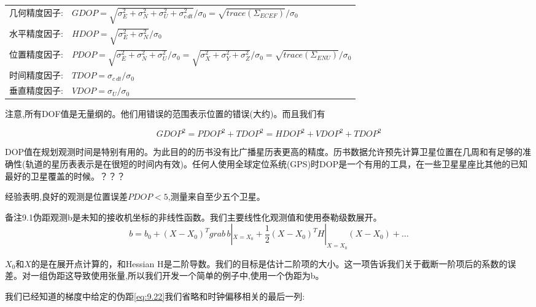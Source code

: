 		\begin{table}

			\begin{tabularx}{\textwidth}{lX}

				几何精度因子: & $GDOP=\sqrt{\sigma^2_E+\sigma^2_N+\sigma^2_U+\sigma^2_{c\,dt}}/\sigma_0=\sqrt{trace(\Sigma_{ECEF})}/\sigma_0$ \\

				水平精度因子:&$HDOP=\sqrt{\sigma^2_E+\sigma^2_N}/\sigma_0$ \\

				位置精度因子:  & $PDOP=\sqrt{\sigma^2_E+\sigma^2_N+\sigma^2_U}/\sigma_0=\sqrt{\sigma^2_X+\sigma^2_Y+\sigma^2_Z}/\sigma_0=\sqrt{trace(\Sigma_{ENU})}/\sigma_0 $ \\

				时间精度因子:	   &$TDOP=\sigma_{c\,dt}/\sigma_0$ \\

				垂直精度因子:  &$VDOP=\sigma_U/\sigma_0$ 

			\end{tabularx}

		\end{table}

	注意,所有DOF值是无量纲的。他们用错误的范围表示位置的错误(大约)。而且我们有

		\begin{equation*}
			GDOP^2=PDOP^2+TDOP^2=HDOP^2+VDOP^2+TDOP^2
		\end{equation*}

	DOP值在规划观测时间是特别有用的。为此目的的历书没有比广播星历表更高的精度。历书数据允许预先计算卫星位置在几周和有足够的准确性(轨道的星历表表示是在很短的时间内有效)。任何人使用全球定位系统(GPS)时DOP是一个有用的工具，在一些卫星星座比其他的已知最好的卫星覆盖的时候。？？？

	经验表明,良好的观测是位置误差$PDOP<5$,测量来自至少五个卫星。

	备注9.1伪距观测b是未知的接收机坐标的非线性函数。我们主要线性化观测值和使用泰勒级数展开。
		\begin{equation*}
			b=b_0+(X-X_0)^Tgrab\,b|_{X=X_0}+\frac{1}{2}(X-X_0)^TH|_{X=X_0}(X-X_0)+\ldots
		\end{equation*}

	$X_0$和$X$的是在展开点计算的，和Hessian H是二阶导数。我们的目标是估计二阶项的大小。这一项告诉我们关于截断一阶项后的系数的误差。对一组伪距这导致使用张量,所以我们开发一个简单的例子中,使用一个伪距为b。
			
	我们已经知道的梯度中给定的伪距\ref{eq:9.22}我们省略和时钟偏移相关的最后一列:

